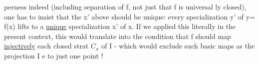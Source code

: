
perness indeed (including separation of f,  not just that f is universal%
ly closed),  one has to insist that the x' above should be unique:
every specialization y' of y= f(x)  lifts to a \uline{unique} specialization
x' of x.  If we applied this literally in the present context,  this
would translate into the condition that \hand{$|$}f\hand{$|$}  should map \uline{injectively}
each closed strat $C_x$ of \hand{$|$}I\hand{$|$} -  which would exclude such basic maps as
the projection I \hand{$\longrightarrow$} e to just one point !

